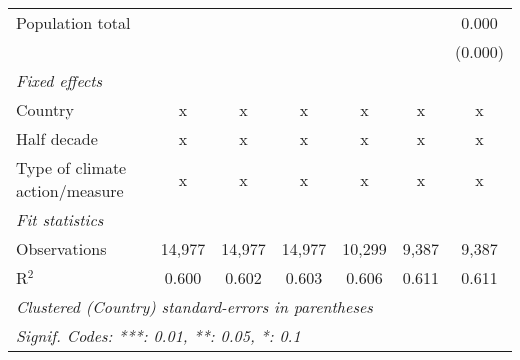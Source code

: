 \begin{tabular}{lcccccc}
   Population total                                     &               &                &                &                &                & 0.000\\   
                                                        &               &                &                &                &                & (0.000)\\   
   \emph{Fixed effects}\\
   Country                                              & x             & x              & x              & x              & x              & x\\  
   Half decade                                          & x             & x              & x              & x              & x              & x\\  
   Type of climate action/measure                       & x             & x              & x              & x              & x              & x\\  
   \midrule \emph{Fit statistics}\\
   Observations                                         & 14,977        & 14,977         & 14,977         & 10,299         & 9,387          & 9,387\\  
   R$^2$                                                & 0.600         & 0.602          & 0.603          & 0.606          & 0.611          & 0.611\\  
   \midrule
   \multicolumn{7}{l}{\emph{Clustered (Country) standard-errors in parentheses}}\\
   \multicolumn{7}{l}{\emph{Signif. Codes: ***: 0.01, **: 0.05, *: 0.1}}\\
\end{tabular}
\par\endgroup


